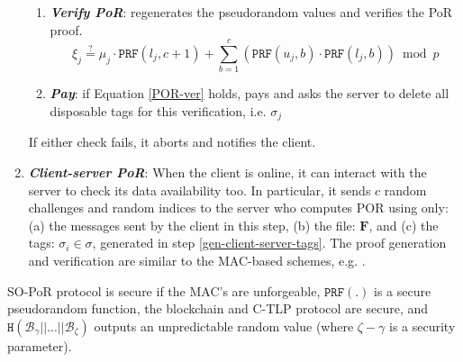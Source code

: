 \begin{enumerate}[leftmargin=.46cm]
\begin{enumerate}
\item\label{verify-PoR}\textbf{\textit{\small {Verify PoR}}}: regenerates the pseudorandom values and verifies the PoR proof.  
\begin{equation}\label{POR-ver}\xi_{\scriptscriptstyle j}\stackrel{\scriptscriptstyle ?}=\mu_{\scriptscriptstyle j}  \cdot\mathtt{PRF}(l_{\scriptscriptstyle j},c+1)+\sum\limits^{\scriptscriptstyle c}_{\scriptscriptstyle b=1} ( \mathtt{PRF}(u_{\scriptscriptstyle j},b)\cdot \mathtt{PRF}(l_{\scriptscriptstyle j},b))\bmod p
\end{equation}
\item\textbf{\textit{\small {Pay}}}: if  Equation \ref{POR-ver} holds, pays and asks the server to delete all disposable tags for this verification, i.e. $\sigma_{\scriptscriptstyle j}$
\end{enumerate}
If either check fails, it aborts and notifies the client. 


\item \textit{\textbf{Client-server PoR}}: When the client is online, it can   interact  with the server  to check its data availability too. In particular, it sends $c$ random challenges and random indices to the server who computes POR using only: (a) the  messages sent by the client in this step, (b) the  file: ${\bm{F}}$, and (c) the tags:  $\sigma_{\scriptscriptstyle i}\in\sigma$, generated in step \ref{gen-client-server-tags}.  The proof generation and verification are similar to the MAC-based schemes, e.g.  \cite{DBLP:conf/asiacrypt/ShachamW08}. 
\end{enumerate}


\begin{theorem}\label{PoR-main-theorem} SO-PoR protocol is secure  if the MAC's are unforgeable, $\mathtt{PRF}(.)$ is a secure pseudorandom function, the blockchain and C-TLP protocol are secure, and $\mathtt{H}( \mathcal {B}_{\scriptscriptstyle \gamma}||...||  \mathcal {B}_{\scriptscriptstyle \zeta})$ outputs an unpredictable random value (where $\zeta-\gamma$ is a security parameter).
\end{theorem}


